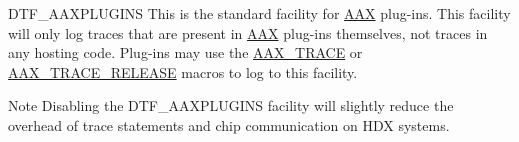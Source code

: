  
\begin{DoxyItemize}
\item {\ttfamily D\+T\+F\+\_\+\+A\+A\+X\+P\+L\+U\+G\+I\+NS} This is the standard facility for \mbox{\hyperlink{a00852}{A\+AX}} plug-\/ins. This facility will only log traces that are present in \mbox{\hyperlink{a00852}{A\+AX}} plug-\/ins themselves, not traces in any hosting code. Plug-\/ins may use the \mbox{\hyperlink{a00395_ab53f1d6a94f8b6ebb3a101f71bfe4e82}{A\+A\+X\+\_\+\+T\+R\+A\+CE}} or \mbox{\hyperlink{a00395_ac2aa820ece56bb59140ad561218db4b3}{A\+A\+X\+\_\+\+T\+R\+A\+C\+E\+\_\+\+R\+E\+L\+E\+A\+SE}} macros to log to this facility. 

\begin{DoxyNote}{Note}
Disabling the {\ttfamily D\+T\+F\+\_\+\+A\+A\+X\+P\+L\+U\+G\+I\+NS} facility will slightly reduce the overhead of trace statements and chip communication on H\+DX systems.  
\end{DoxyNote}


\end{DoxyItemize}
